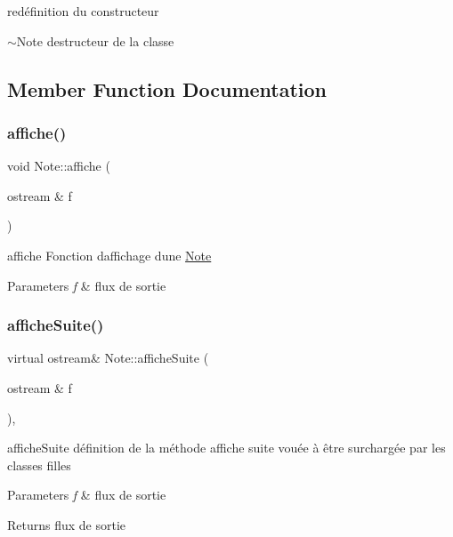 redéfinition du constructeur 

$\sim$\+Note destructeur de la classe 

\subsection{Member Function Documentation}
\mbox{\label{classNote_aa1130702f72fac6d9a600066d76ba939}} 
\subsubsection{\texorpdfstring{affiche()}{affiche()}}
{\footnotesize\ttfamily void Note\+::affiche (\begin{DoxyParamCaption}\item[{ostream \&}]{f }\end{DoxyParamCaption})}



affiche Fonction d\textquotesingle{}affichage d\textquotesingle{}une \hyperlink{classNote}{Note} 


\begin{DoxyParams}{Parameters}
{\em f} & flux de sortie \\
\hline
\end{DoxyParams}
\mbox{\label{classNote_ad3c0d7e48ef8244ead577128993a6f1f}} 
\subsubsection{\texorpdfstring{affiche\+Suite()}{afficheSuite()}}
{\footnotesize\ttfamily virtual ostream\& Note\+::affiche\+Suite (\begin{DoxyParamCaption}\item[{ostream \&}]{f }\end{DoxyParamCaption})\hspace{0.3cm}{\ttfamily [inline]}, {\ttfamily [virtual]}}



affiche\+Suite définition de la méthode affiche suite vouée à être surchargée par les classes filles 


\begin{DoxyParams}{Parameters}
{\em f} & flux de sortie \\
\hline
\end{DoxyParams}
\begin{DoxyReturn}{Returns}
flux de sortie 
\end{DoxyReturn}


